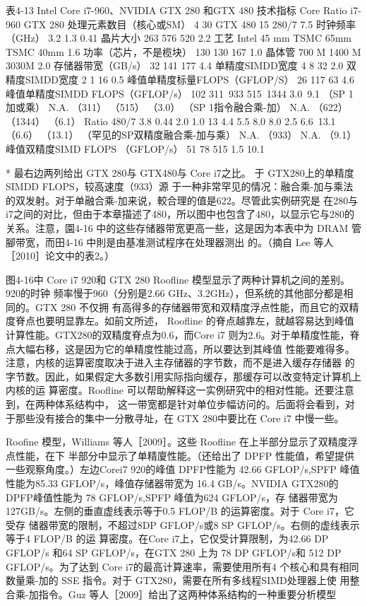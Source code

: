 表4-13 Intel Core i7-960、NVIDIA GTX 280 和GTX 480 技术指标
Core
Ratio
i7-960
GTX 280
处理元素数目（核心或SM）
4
30
GTX 480
15
280/7
7.5
时钟频率（GHz）
3.2
1.3
0.41
晶片大小
263
576
520
2.2
工艺
Intel 45 mm
TSMC 65mm
TSMC 40mm
1.6
功率（芯片，不是榄块）
130
130
167
1.0
晶体管
700 M
1400 M
3030M
2.0
存储器带宽（GB/s）
32
141
177
4.4
单精度SIMDD宽度
4
8
32
2.0
双精度SIMDD宽度
2
1
16
0.5
峰值单精度标量FLOPS（GFLOP/S）
26
117
63
4.6
峰值单精度SIMDD FLOPS（GFLOP/s）
102
311~933
515~1344
3.0~9.1
（SP 1加或乘）
N.A.
（311）
（515）
（3.0）
（SP 1指令融合乘-加）
N.A.
（622）
（1344）
（6.1）
Ratio
480/7
3.8
0.44
2.0
1.0
13
4.4
5.5
8.0
8.0
2.5
6.6~13.1
（6.6）
（13.1）
（罕见的SP双精度融合乘-加与乘）
N.A.
（933）
N.A.
（9.1）
峰值双精度SIMD FLOPS （GFLOP/s）
51
78
515
1.5
10.1

* 最右边两列给出 GTX 280与 GTX480与 Core i7之比。 于 GTX280上的单精度 SIMDD FLOPS，较高速度（933）源
于一种非常罕见的情况：融合乘-加与乘法的双发射。对于单融合乘-加来说，較合理的值是622。尽管此实例研究是
在280与i7之间的对比，但由于本章描述了480，所以图中也包含了480，以显示它与280的关系。注意，園4-16
中的这些存储器带宽更高一些，这是因为本表中为 DRAM 管腳带宽，而田4-16 中則是由基准测试程序在处理器测出
的。（摘自 Lee 等人［2010］论文中的表2。）

图4-16中 Core i7 920和 GTX 280 Roofline 模型显示了两种计算机之间的差别。920的时钟
频率慢于960（分别是2.66 GHz、3.2GHz），但系统的其他部分都是相同的。GTX 280 不仅拥
有高得多的存储器带宽和双精度浮点性能，而且它的双精度脊点也要明显靠左。如前文所述，
Roofline 的脊点越靠左，就越容易达到峰值计算性能。GTX280的双精度脊点为0.6，而Core i7
则为2.6。对于单精度性能，脊点大幅右移，这是因为它的单精度性能过高，所以要达到其峰值
性能要难得多。注意，内核的运算密度取决于进入主存储器的字节数，而不是进入缓存存储器
的字节数。因此，如果假定大多数引用实际指向缓存，那缓存可以改变特定计算机上内核的运
算密度。Roofline 可以帮助解释这一实例研究中的相对性能。还要注意到，在两种体系结构中，
这一带宽都是针对单位步幅访问的。后面将会看到，对于那些没有接合的集中一分散寻址，在
GTX 280中要比在 Core i7 中慢一些。

Roofine 模型，Williams 等人［2009］。这些 Roofline 在上半部分显示了双精度浮点性能，在下
半部分中显示了单精廈性能。（还给出了 DPFP 性能值，希望提供一些观察角度。）左边Corei7
920的峰值 DPFP性能为 42.66 GFLOP/s,SPFP 峰值性能为85.33 GFLOP/s，峰值存储器带宽为
16.4 GB/s。NVIDIA GTX280的DPFP峰值性能为 78 GFLOP/s,SPFP 峰值为624 GFLOP/s，存
储器带宽为127GB/s。左侧的垂直虚线表示等于0.5 FLOP/B 的运算密度。对于 Core i7，它受存
储器带宽的限制，不超过8DP GFLOP/s或8 SP GFLOP/s。右侧的虚线表示等于4 FLOP/B 的运
算密度。在Core i7上，它仅受计算限制，为42.66 DP GFLOP/s 和64 SP GFLOP/s，在GTX 280
上为 78 DP GFLOP/s和 512 DP GFLOP/s。为了达到 Core i7的最高计算速率，需要使用所有4
个核心和具有相同数量乘-加的 SSE 指令。对于 GTX280，需要在所有多线程SIMD处理器上使
用整合乘-加指令。Guz 等人［2009］给出了这两种体系结构的一种重要分析模型

